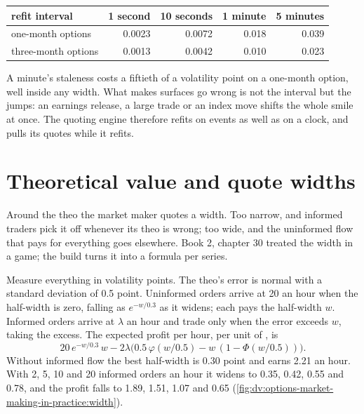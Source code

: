 \begin{center}\small
\begin{tabular}{lrrrr}
\toprule
refit interval & 1 second & 10 seconds & 1 minute & 5 minutes\\
\midrule
one-month options & 0.0023 & 0.0072 & 0.018 & 0.039\\
three-month options & 0.0013 & 0.0042 & 0.010 & 0.023\\
\bottomrule
\end{tabular}
\end{center}

A minute's staleness costs a fiftieth of a volatility point on a one-month option, well inside any width. What makes surfaces go wrong is not the
interval but the jumps: an earnings release, a large trade or an index move shifts the whole smile at once. The quoting engine therefore refits on
events as well as on a clock, and pulls its quotes while it refits.

\section{Theoretical value and quote widths}

Around the theo the market maker quotes a width. Too narrow, and informed traders pick it off whenever its theo is wrong; too wide, and the
uninformed flow that pays for everything goes elsewhere. Book 2, chapter 30 treated the width in a game; the build turns it into a formula per
series.

\begin{example}\label{ex:dv:options-market-making-in-practice:width}
Measure everything in volatility points. The theo's error is normal with a standard deviation of 0.5 point. Uninformed orders arrive at 20 an hour
when the half-width is zero, falling as $e^{-w/0.3}$ as it widens; each pays the half-width $w$. Informed orders arrive at $\lambda$ an hour and
trade only when the error exceeds $w$, taking the excess. The expected profit per hour, per unit of , is
\[
20\,e^{-w/0.3}\,w-2\lambda\bigl(0.5\,\varphi(w/0.5)-w\,(1-\Phi(w/0.5))\bigr).
\]
Without informed flow the best half-width is 0.30 point and earns 2.21 an hour. With 2, 5, 10 and 20 informed orders an hour it widens to 0.35,
0.42, 0.55 and 0.78, and the profit falls to 1.89, 1.51, 1.07 and 0.65
(\cref{fig:dv:options-market-making-in-practice:width}).
\end{example}

